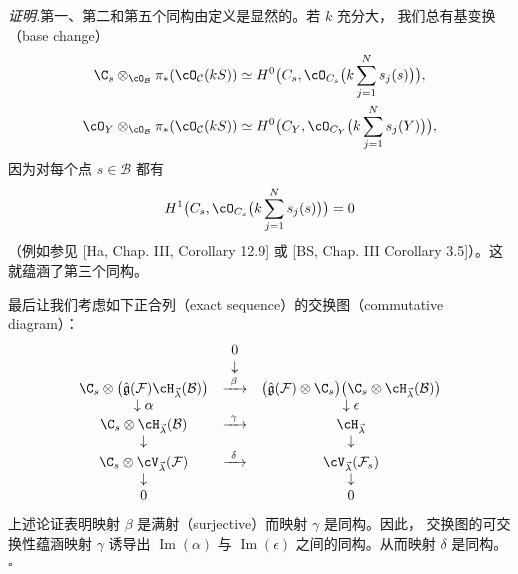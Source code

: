 \noindent\textit{证明.}\quad 第一、第二和第五个同构由定义是显然的。若 $k$ 充分大，
我们总有基变换（base change）
\[
  \begin{aligned}
  \C_s\otimes_{\cO_\mathcal{B}}\pi_*(\cO_\mathcal{C}(kS))
  &\simeq H^0\bigl(C_s,\cO_{C_s}\bigl(k\sum_{j=1}^Ns_j(s)\bigr)\bigr),\\
  \cO_Y\otimes_{\cO_\mathcal{B}}\pi_*(\cO_\mathcal{C}(kS))
  &\simeq H^0\bigl(C_Y,\cO_{C_Y}\bigl(k\sum_{j=1}^Ns_j(Y)\bigr)\bigr),
  \end{aligned}
\]
因为对每个点 $s\in\mathcal{B}$ 都有
\[
  H^1\bigl(C_s,\cO_{C_s}\bigl(k\sum_{j=1}^Ns_j(s)\bigr)\bigr)=0
\]
（例如参见 [Ha, Chap. III, Corollary 12.9] 或 [BS, Chap. III Corollary
3.5]）。这就蕴涵了第三个同构。

最后让我们考虑如下正合列（exact sequence）的交换图（commutative diagram）：
\[
  \begin{array}{ccc}
  & 0 & \\
  & \downarrow & \\
  \C_s\otimes\bigl(\hat{\mathfrak{g}}(\mathcal{F})
    \cH_{\vec{\lambda}}(\mathcal{B})\bigr)
  & \xrightarrow{\ \beta\ } &
  \bigl(\hat{\mathfrak{g}}(\mathcal{F})\otimes\C_s\bigr)
    \bigl(\C_s\otimes\cH_{\vec{\lambda}}(\mathcal{B})\bigr)\\
  \downarrow\alpha & & \downarrow\epsilon\\
  \C_s\otimes\cH_{\vec{\lambda}}(\mathcal{B})
  & \xrightarrow{\ \gamma\ } & \cH_{\vec{\lambda}}\\
  \downarrow & & \downarrow\\
  \C_s\otimes\cV_{\vec{\lambda}}(\mathcal{F})
  & \xrightarrow{\ \delta\ } & \cV_{\vec{\lambda}}(\mathcal{F}_s)\\
  \downarrow & & \downarrow\\
  0 & & 0
  \end{array}
\]
上述论证表明映射 $\beta$ 是满射（surjective）而映射 $\gamma$ 是同构。因此，
交换图的可交换性蕴涵映射 $\gamma$ 诱导出 $\operatorname{Im}(\alpha)$ 与
$\operatorname{Im}(\epsilon)$ 之间的同构。从而映射 $\delta$ 是同构。
\hfill$\square$

